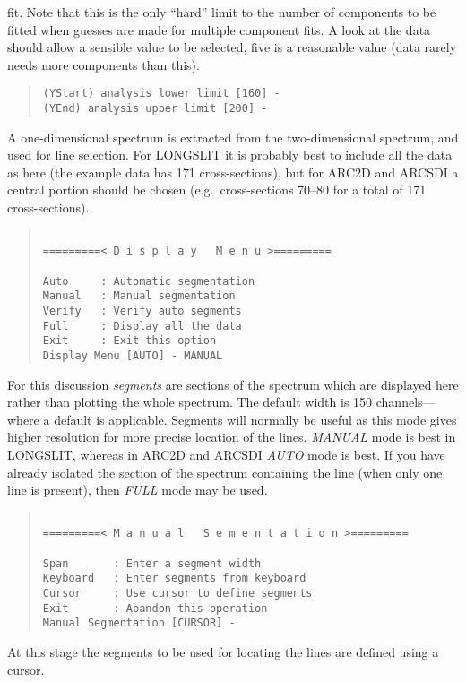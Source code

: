 fit.
Note that this is the only ``hard'' limit to the number of components to
be fitted when guesses are made for multiple component fits.
A look at the data should allow a sensible value to be selected, five is
a reasonable value (data rarely needs more components than this).
\begin{quote}\begin{verbatim}
(YStart) analysis lower limit [160] -
(YEnd) analysis upper limit [200] -
\end{verbatim}\end{quote}
A one-dimensional spectrum is extracted from the two-dimensional
spectrum, and used for line selection.
For LONGSLIT it is probably best to include all the data as here (the
example data has 171 cross-sections), but for ARC2D and ARCSDI a central
portion should be chosen (e.g.\ cross-sections 70--80 for a total of 171
cross-sections).
\begin{quote}\begin{verbatim}
 
=========< D i s p l a y   M e n u >=========
 
Auto     : Automatic segmentation
Manual   : Manual segmentation
Verify   : Verify auto segments
Full     : Display all the data
Exit     : Exit this option
Display Menu [AUTO] - MANUAL
\end{verbatim}\end{quote}
For this discussion {\em segments} are sections of the spectrum which
are displayed here rather than plotting the whole spectrum.
The default width is 150 channels---where a default is applicable.
Segments will normally be useful as this mode gives higher resolution
for more precise location of the lines.
{\em MANUAL} mode is best in LONGSLIT, whereas in ARC2D and ARCSDI {\em
AUTO} mode is best.
If you have already isolated the section of the spectrum containing the
line (when only one line is present), then {\em FULL} mode may be used.
\begin{quote}\begin{verbatim}
 
=========< M a n u a l   S e m e n t a t i o n >=========
 
Span       : Enter a segment width
Keyboard   : Enter segments from keyboard
Cursor     : Use cursor to define segments
Exit       : Abandon this operation
Manual Segmentation [CURSOR] -
\end{verbatim}\end{quote}
At this stage the segments to be used for locating the lines are
defined using a cursor.
